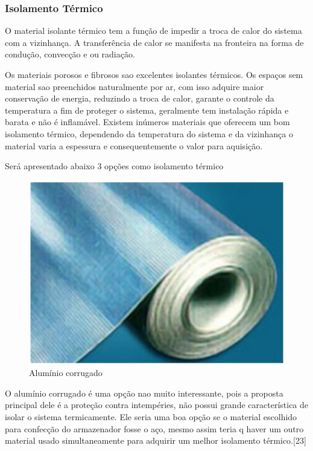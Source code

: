 \subsubsection{Isolamento Térmico}

O material isolante térmico tem a função de impedir a troca de calor do sistema com a vizinhança. A transferência de calor se manifesta na fronteira na forma de condução, convecção e ou radiação.

Os materiais porosos e fibrosos sao excelentes isolantes térmicos. Os espaços sem material sao preenchidos naturalmente por ar, com isso adquire maior conservação de energia, reduzindo a troca de calor, garante o controle da temperatura a fim de proteger o sistema, geralmente tem instalação rápida e barata e não é inflamável. Existem inúmeros materiais que oferecem um bom isolamento térmico, dependendo da temperatura do sistema e da vizinhança o material varia a espessura e consequentemente o valor para aquisição.

Será apresentado abaixo 3 opções como isolamento térmico


\begin{figure}[H]
 \centering
   \includegraphics[keepaspectratio=true,scale=0.8]{figuras/aluminio.eps}
 \caption{Alumínio corrugado}
 \label{aluminio}
\end{figure}

O alumínio corrugado é uma opção nao muito interessante, pois a proposta principal dele é a proteção contra intempéries, não possui grande característica de isolar o sistema termicamente. Ele seria uma boa opção se o material escolhido para confecção do armazenador fosse o aço, mesmo assim teria q haver um outro material usado simultaneamente para adquirir um melhor isolamento térmico.[23]

